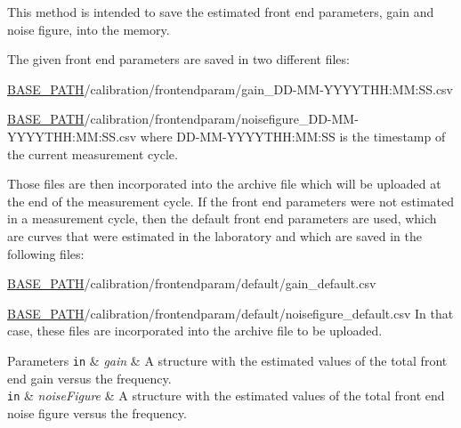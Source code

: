 This method is intended to save the estimated front end parameters, gain and noise figure, into the memory. 

The given front end parameters are saved in two different files\+:
\begin{DoxyItemize}
\item \hyperlink{Basics_8h_a0423f4cb393331ce0b9f6b3a43adcaae}{B\+A\+S\+E\+\_\+\+P\+A\+TH}/calibration/frontendparam/gain\+\_\+\+D\+D-\/\+M\+M-\/\+Y\+Y\+Y\+Y\+T\+HH\+:MM\+:S\+S.\+csv
\item \hyperlink{Basics_8h_a0423f4cb393331ce0b9f6b3a43adcaae}{B\+A\+S\+E\+\_\+\+P\+A\+TH}/calibration/frontendparam/noisefigure\+\_\+\+D\+D-\/\+M\+M-\/\+Y\+Y\+Y\+Y\+T\+HH\+:MM\+:S\+S.\+csv where D\+D-\/\+M\+M-\/\+Y\+Y\+Y\+Y\+T\+HH\+:MM\+:SS is the timestamp of the current measurement cycle.
\end{DoxyItemize}

Those files are then incorporated into the archive file which will be uploaded at the end of the measurement cycle. If the front end parameters were not estimated in a measurement cycle, then the default front end parameters are used, which are curves that were estimated in the laboratory and which are saved in the following files\+:
\begin{DoxyItemize}
\item \hyperlink{Basics_8h_a0423f4cb393331ce0b9f6b3a43adcaae}{B\+A\+S\+E\+\_\+\+P\+A\+TH}/calibration/frontendparam/default/gain\+\_\+default.csv
\item \hyperlink{Basics_8h_a0423f4cb393331ce0b9f6b3a43adcaae}{B\+A\+S\+E\+\_\+\+P\+A\+TH}/calibration/frontendparam/default/noisefigure\+\_\+default.csv In that case, these files are incorporated into the archive file to be uploaded. 
\begin{DoxyParams}[1]{Parameters}
\mbox{\tt in}  & {\em gain} & A structure with the estimated values of the total front end gain versus the frequency. \\
\hline
\mbox{\tt in}  & {\em noise\+Figure} & A structure with the estimated values of the total front end noise figure versus the frequency. \\
\hline
\end{DoxyParams}

\end{DoxyItemize}\mbox{\label{classDataLogger_a0c772c3529adc3759ba0e1e596500f65}} 
